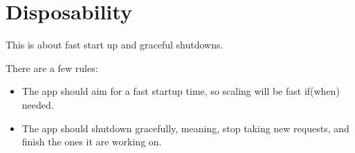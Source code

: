 \section*{Disposability}
This is about fast start up and graceful shutdowns.

There are a few rules:
\begin{itemize}
\item The app should aim for a fast startup time, so scaling will be fast if(when) needed.
\item The app should shutdown gracefully, meaning, stop taking new requests, and finish the ones it are working on.
\end{itemize}